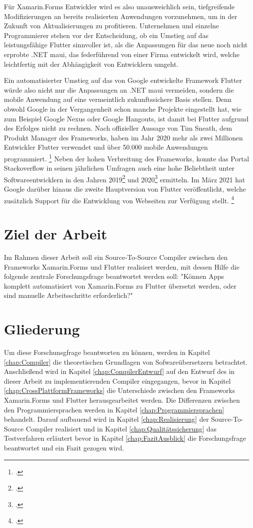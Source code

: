 Für Xamarin.Forms Entwickler wird es also unausweichlich sein,  tiefgreifende Modifizierungen an bereits realisierten Anwendungen vorzunehmen,  um in der Zukunft von Aktualisierungen zu profitieren.  Unternehmen und einzelne Programmierer stehen vor der Entscheidung,  ob ein Umstieg auf das leistungsfähige Flutter sinnvoller ist,  als die Anpassungen für das neue noch nicht erprobte .NET \ac{maui},  das federführend von einer Firma entwickelt wird,  welche leichtfertig mit der Abhängigkeit von Entwicklern umgeht.

Ein automatisierter Umstieg auf das von Google entwickelte Framework Flutter würde also nicht nur die Anpassungen an .NET \ac{maui} vermeiden,  sondern die mobile Anwendung auf eine vermeintlich zukunftssichere Basis stellen.  Denn obwohl Google in der Vergangenheit schon manche Projekte eingestellt hat,  wie zum Beispiel Google Nexus oder Google Hangouts,  ist damit bei Flutter aufgrund des Erfolges nicht zu rechnen.  Nach offizieller Aussage von Tim Sneath, dem Produkt Manager des Frameworks,  haben im Jahr 2020 mehr als zwei Millionen Entwickler Flutter verwendet und über 50.000 mobile Anwendungen programmiert. \footcite[Vgl.][Abgerufen am 28.10.2020]{Sneath2020} Neben der hohen Verbreitung des Frameworks,  konnte das Portal Stackoverflow in seinen jährlichen Umfragen auch eine hohe Beliebtheit unter Softwareentwicklern in den Jahren 2019\footcite[Vgl.][Abgerufen am 28.10.2020]{Stack2019} und 2020\footcite[Vgl.][Abgerufen am 28.10.2020]{Stack2020} ermitteln.  Im März 2021 hat Google darüber hinaus die zweite Hauptversion von Flutter veröffentlicht,  welche zusätzlich Support für die Entwicklung von Webseiten zur Verfügung stellt. \footcite[Vgl.][Abgerufen am 28.10.2020]{GoogleFlutter2}


\section{Ziel der Arbeit}
Im Rahmen dieser Arbeit soll ein Source-To-Source Compiler zwischen den Frameworks Xamarin.Forms und Flutter realisiert werden, mit dessen Hilfe die folgende zentrale Forschungsfrage beantwortet werden soll: "Können Apps komplett automatisiert von Xamarin.Forms zu Flutter übersetzt werden, oder sind manuelle Arbeitsschritte erforderlich?"

\section{Gliederung}
Um diese Forschunsgfrage beantworten zu können, werden in Kapitel \ref{chap:Compiler} die theoretischen Grundlagen von Sofwareübersetzern betrachtet.   Anschließend wird in Kapitel \ref{chap:CompilerEntwurf} auf den Entwurf des in dieser Arbeit zu implementierenden Compiler eingegangen, bevor in Kapitel \ref{chap:CrossPlattformFrameworks} die Unterschiede zwischen den Frameworks Xamarin.Forms und Flutter herausgearbeitet werden.  Die Differenzen zwischen den Programmiersprachen werden in Kapitel \ref{chap:Programmiersprachen} behandelt. Darauf aufbauend wird in Kapitel \ref{chap:Realisierung} der Source-To-Source Compiler realisiert und in Kapitel \ref{chap:Qualitätssicherung} das Testverfahren erläutert bevor in Kapitel \ref{chap:FazitAusblick}  die Forschungsfrage beantwortet und ein Fazit gezogen wird. 